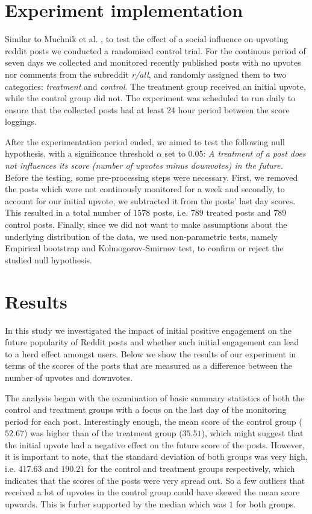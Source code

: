\documentclass[fleqn,12pt]{article}
\begin{document}
\section{Experiment implementation}
Similar to Muchnik et al. \cite{muchnik}, to test the effect of a social
influence on upvoting reddit posts we conducted a randomised control trial.
For the continous period of seven days we collected and monitored recently published posts with no upvotes 
nor comments from the subreddit \textit{r/all}, and randomly assigned them 
to two categories: \textit{treatment} and \textit{control}.
The treatment group received an initial upvote, while the control group did not. 
The experiment was scheduled to run daily to ensure that the collected posts
had at least 24 hour period between the score loggings.

After the experimentation period ended, we aimed to test the following null hypothesis, with a significance
threshold $\alpha$ set to 0.05:
\textit{A treatment of a post does not influences its score (number of upvotes minus downvotes) in the future.}
Before the testing, some pre-processing steps were necessary. 
First, we removed the posts which were not continously monitored for a week and secondly,
to account for our initial upvote, we subtracted it from the posts' last day scores.
This resulted in a total number of $1578$ posts, i.e. $789$ treated posts and $789$ control posts. 
Finally, since we did not want to make assumptions about the underlying 
distribution of the data, we used non-parametric tests, namely Empirical bootstrap and Kolmogorov-Smirnov test, to
confirm or reject the studied null hypothesis.

\section{Results}
In this study we investigated the impact of initial positive
engagement on the future popularity of Reddit posts and whether 
such initial engagement can lead to a herd effect amongst users. 
Below we show the results of our experiment in terms of the scores of the posts
that are measured as a difference between the number of upvotes and downvotes.

The analysis began with the examination of basic summary statistics
of both the control and treatment groups with a focus
on the last day of the monitoring period for each post. Interestingly enough,
the mean score of the control group ($52.67$) was higher than of the treatment group ($35.51$),
which might suggest that the initial upvote had a negative effect on the future score of the posts.
However, it is important to note, that the standard deviation of both groups was very high, 
i.e. $417.63$ and $190.21$ for the control and treatment groups respectively, which indicates
that the scores of the posts were very spread out. So a few outliers that received a lot of upvotes
in the control group could have skewed the mean score upwards. This is furher supported by the median
which was $1$ for both groups.
\end{document}
